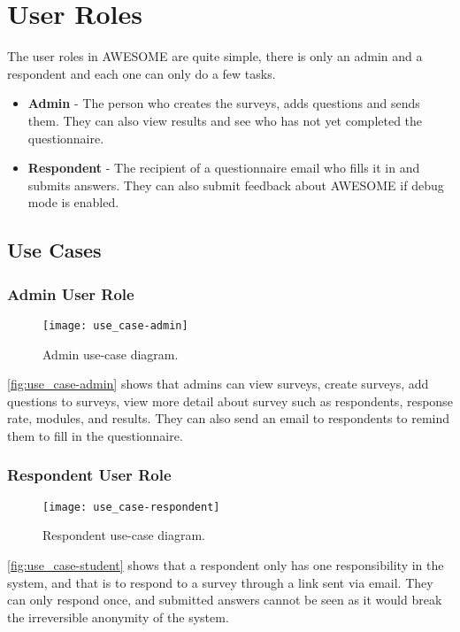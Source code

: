 	\section{User Roles}
	
	The user roles in \ac{AWESOME} are quite simple, there is only an admin and a respondent and each one can only do a few tasks.
	
	\begin{itemize}
		\item \textbf{Admin} - The person who creates the surveys, adds questions and sends them. They can also view results and see who has not yet completed the questionnaire.
		\item \textbf{Respondent} - The recipient of a questionnaire email who fills it in and submits answers. They can also submit feedback about \ac{AWESOME} if debug mode is enabled.
	\end{itemize}
	
	\subsection{Use Cases}
	
	\subsubsection{Admin User Role}
	
	\begin{figure}[h]
		\texttt{[image: use\_case-admin]}
		\caption{Admin use-case diagram.}
		\label{fig:use_case-admin}
	\end{figure}
	
	\autoref{fig:use_case-admin} shows that admins can view surveys, create surveys, add questions to surveys, view more detail about survey such as respondents, response rate, modules, and results.
	They can also send an email to respondents to remind them to fill in the questionnaire.
	
	\newpage
	
	\subsubsection{Respondent User Role}
	
	\begin{figure}[h]
		\label{fig:use_case-student}
		\texttt{[image: use\_case-respondent]}
		\caption{Respondent use-case diagram.}
	\end{figure}
	
	\autoref{fig:use_case-student} shows that a respondent only has one responsibility in the system, and that is to respond to a survey through a link sent via email.
	They can only respond once, and submitted answers cannot be seen as it would break the irreversible anonymity of the system.